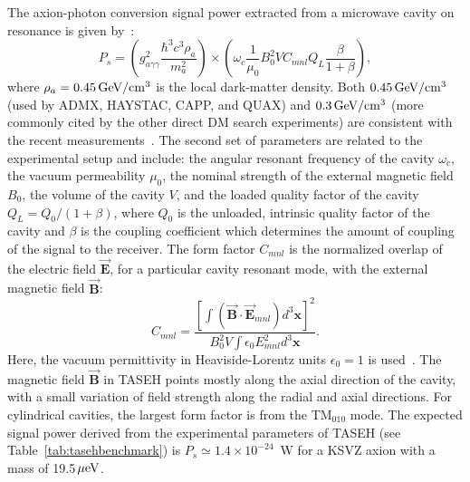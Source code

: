 \documentclass[%
reprint, %
superscriptaddress,
 amsmath,amssymb,
 aps
]{revtex4-2}
\begin{document}
The axion-photon conversion signal power extracted from a microwave cavity on 
resonance is given 
by~\cite{AxionFormula,HAYSTACIII}:
\begin{equation}
P_s = \left(g_{a\gamma\gamma}^2\frac{\hbar^3c^3\rho_a}{m_a^2}\right)\times
\left(\omega_c\frac{1}{\mu_0}B_0^2VC_{mnl}Q_L\frac{\beta}{1+\beta}\right),
\label{eq:ps}
\end{equation}
where $\rho_a=0.45\,\text{Ge\hspace{-.08em}V}/\mathrm{cm}^3$ is the local 
dark-matter density. Both $0.45\,\text{Ge\hspace{-.08em}V}/\mathrm{cm}^3$ 
(used by ADMX, HAYSTAC, CAPP, and QUAX) and 
$0.3\,\text{Ge\hspace{-.08em}V}/\mathrm{cm}^3$ (more commonly cited 
by the other direct DM search experiments) are consistent with the recent 
measurements~\cite{Read:2014qva,PDG}. 
The second set of parameters are related to the experimental 
setup and include: the angular resonant frequency of the cavity $\omega_c$, 
the vacuum permeability $\mu_0$, the nominal strength of the external magnetic 
field $B_0$, the volume of the cavity $V$, and the loaded quality factor of 
the cavity \(Q_L=Q_0/(1+\beta)\), where $Q_0$ is the unloaded, intrinsic 
quality factor of the cavity and $\beta$ is the coupling coefficient which 
determines the amount of coupling of the signal to the receiver. The form 
factor $C_{mnl}$ is the normalized overlap of the electric field 
$\vec{\bm{E}}$, for a particular cavity resonant mode, with the external 
magnetic field $\vec{\bm{B}}$:
\begin{equation}
  C_{mnl} = \frac{\left[\int\left( \vec{\bm{B}}\cdot\vec{\bm{E}}_{mnl}\right) d^3\bm{x}\right]^2}{B_0^2V\int \epsilon_0 E_{mnl}^2 d^3\bm{x}}.
\label{eq:formfactor} 
\end{equation}
Here, the vacuum permittivity in Heaviside-Lorentz units $\epsilon_0=1$ is 
used~\cite{AxionReview}. 
The magnetic field $\vec{\bm{B}}$ in TASEH points mostly along the axial 
direction of the cavity, with a small variation of 
field strength along the radial and axial directions.  
For cylindrical cavities, the largest form factor is from the 
TM$_{010}$ mode. The expected signal power derived from the experimental 
parameters of TASEH (see Table~\ref{tab:tasehbenchmark}) 
is $P_s\simeq 1.4\times10^{-24}$~W for a KSVZ axion with a 
mass of 19.5$\,\mu\text{e\hspace{-.08em}V}$. 
\end{document}
